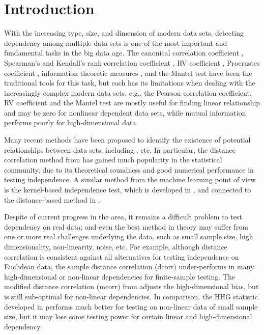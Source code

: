 \documentclass[11pt]{article}
\begin{document}
\section{Introduction}
With the increasing type, size, and dimension of modern data sets, detecting dependency among multiple data sets is one of the most important and fundamental tasks in the big data age. The canonical correlation coefficient \cite{Hotelling1936}, Spearman's and Kendall's rank correlation coefficient \cite{KendallBook}, RV coefficient \cite{RobertEscoufier1976}, Procrustes coefficient \cite{GowerProcrustesBook}, information theoretic measures \cite{Renyi1959}, and the Mantel test \cite{Mantel1967} have been the traditional tools for this task, but each has its limitations when dealing with the increasingly complex modern data sets, e.g., the Pearson correlation coefficient, RV coefficient and the Mantel test are mostly useful for finding linear relationship and may be zero for nonlinear dependent data sets, while mutual information performs poorly for high-dimensional data. 

Many recent methods have been proposed to identify the existence of potential relationships between data sets, including \cite{Baringhaus2004,TaskinenOjaRandles2005, GrettonEtAl2005, SzekelyRizzoBakirov2007, GrettonGyorfi2010,Reshef2011, HellerGorfine2013, Reimherr2013, SzekelyRizzo2013a, SzekelyRizzo2013b}, etc. In particular, the distance correlation method from \cite{SzekelyRizzoBakirov2007}  has gained much popularity in the statistical community, due to its theoretical soundness and good numerical performance in testing independence. A similar method from the machine learning point of view is the kernel-based independence test, which is developed in \cite{GrettonEtAl2005, GrettonGyorfi2010, GrettonEtAl2012}, and connected to the distance-based method in \cite{SejdinovicEtAl2013}.

Despite of current progress in the area, it remains a difficult problem to test dependency on real data; and even the best method in theory may suffer from one or more real challenges underlying the data, such as small sample size, high dimensionality, non-linearity, noise, etc. For example, although distance correlation is consistent against all alternatives for testing independence on Euclidean data, the sample distance correlation (dcorr) under-performs in many high-dimensional or non-linear dependencies for finite-sample testing. The modified distance correlation (mcorr) from \cite{SzekelyRizzo2013a} adjusts the high-dimensional bias, but is still sub-optimal for non-linear dependencies. In comparison, the HHG statistic developed in \cite{HellerGorfine2013} performs much better for testing on non-linear data of small sample size, but it may lose some testing power for certain linear and high-dimensional dependency.
\end{document}
